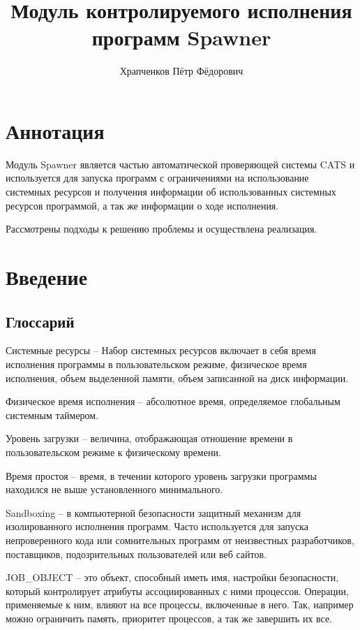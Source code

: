 \documentclass{imcs}
\title{Модуль контролируемого исполнения программ Spawner}
\author{Храпченков Пётр Фёдорович}
\begin{document}
\maketitle

\tableofcontents
\pagebreak

\section*{Аннотация}
Модуль Spawner является частью автоматической проверяющей системы CATS и используется для запуска программ с ограничениями на использование системных ресурсов и получения информации об использованных системных ресурсов программой, а так же информации о ходе исполнения.

Рассмотрены подходы к решению проблемы и осуществлена реализация.

\pagebreak

\section{Введение}
\subsection{Глоссарий}

Системные ресурсы -- Набор системных ресурсов включает в себя время исполнения программы в пользовательском режиме, физическое время исполнения, объем выделенной памяти, объем записанной на диск информации.

Физическое время исполнения -- абсолютное время, определяемое глобальным системным таймером.

Уровень загрузки -- величина, отображающая отношение времени в пользовательском режиме к физическому времени.

Время простоя -- время, в течении которого уровень загрузки программы находился не выше установленного минимального.

Sandboxing -- в компьютерной безопасности защитный механизм для изолированного исполнения программ. Часто используется для запуска непроверенного кода или сомнительных программ от неизвестных разработчиков, поставщиков, подозрительных пользователей или веб сайтов.

JOB\_OBJECT -- это объект, способный иметь имя, настройки безопасности, который контролирует атрибуты ассоциированных с ними процессов. Операции, применяемые к ним, влияют на все процессы, включенные в него. Так, например можно ограничить память, приоритет процессов, а так же завершить их все.
\end{document}
